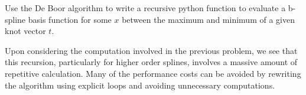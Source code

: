 \begin{problem}
Use the De Boor algorithm to write a recursive python function to evaluate a b-spline basis function for some $x$ between the maximum and minimum of a given knot vector $t$.
\end{problem}

Upon considering the computation involved in the previous problem, we see that this recursion, particularly for higher order splines, involves a massive amount of repetitive calculation.
Many of the performance costs can be avoided by rewriting the algorithm using explicit loops and avoiding unnecessary computations.

\begin{comment}

First, notice that for splines of order $2$ and higher, we actually compute the values of some splines multiple times.
A simple way to avoid this is to figure out which of the 0-order splines we will actually use in our computation, compute them all, then compute all the needed splines of order 1, 2, etc.

There is also some redundant computation in the computation of the coefficients used at each stage of the recursion.
This can be eliminated by using good control structure and a temporary variable.

We will label the left and right coefficients in the formula $L$ and $R$ respectively, so we have $L(i, k, x) = \frac{x - t_i}{t_{i + k} - t_i}$ and $R(i, p, u) = \frac{t_{i + k + 1} - x}{t_{i + k + 1} - t_{i + 1}}$.
Notice that $L(i + 1, k, x) = 1 - R(i, k, x)$.
We can eliminate much of the duplicate computation by computing the new left hand side coefficient the iteration before we actually need it.
This avoids nearly all the repeated computation.

\begin{problem}
Write a function that uses loops instead of recursion to compute the values for all the b-spline basis functions of a given power $k$ for a given array of $t$ values.
Return the answer as a two dimensional array with the results for each polynomial stored in each of the rows of the array.
\end{problem}

It is worth noting that you can remove further excess computation when evaluating a single function and even further when evaluating a single function at a single point.
This can be done by figuring out in advance which of the $N_{i,k}$ will be nonzero and only iterating over those terms.
This approach may or may not be faster depending on the form of the problem.

\end{comment}

